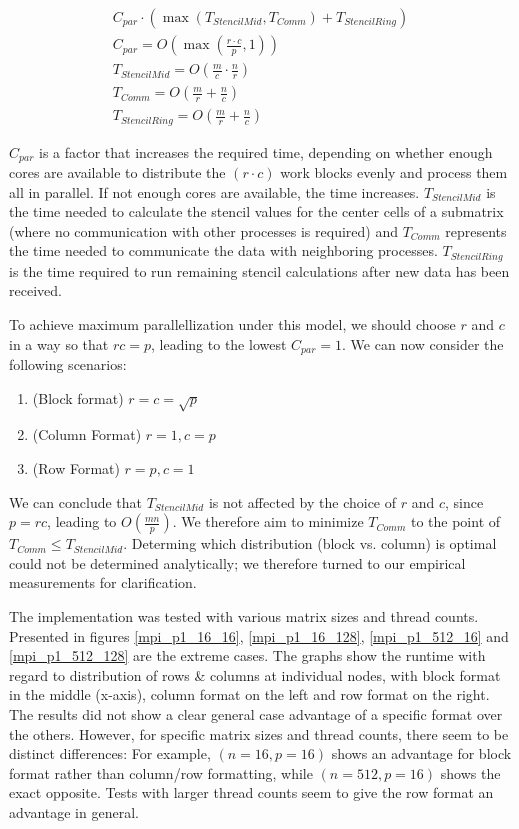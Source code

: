 \documentclass[12pt]{article}
\begin{document}
\begin{eqnarray}
C_{par} \cdot \left( \max(T_{StencilMid}, T_{Comm}) + T_{StencilRing} \right)\\
C_{par} = O\left(\max(\frac{r\cdot c}{p}, 1)\right)\\
T_{StencilMid} = O\left(\frac{m}{c} \cdot \frac{n}{r}\right)\\
T_{Comm} = O\left(\frac{m}{r} + \frac{n}{c}\right)\\
T_{StencilRing} = O\left(\frac{m}{r} + \frac{n}{c}\right)
\end{eqnarray}

$C_{par}$ is a factor that increases the required time, depending on whether enough cores are available to distribute the $(r \cdot c)$ work blocks evenly and process them all in parallel. If not enough cores are available, the time increases. $T_{StencilMid}$ is the time needed to calculate the stencil values for the center cells of a submatrix (where no communication with other processes is required) and $T_{Comm}$ represents the time needed to communicate the data with neighboring processes. $T_{StencilRing}$ is the time required to run remaining stencil calculations after new data has been received.

To achieve maximum parallellization under this model, we should choose $r$ and $c$ in a way so that $rc = p$, leading to the lowest $C_{par} = 1$. We can now consider the following scenarios:

\begin{enumerate}
\item (Block format) $r = c = \sqrt{p}$ 
\item (Column Format) $r = 1, c = p$
\item (Row Format) $r = p, c = 1$
\end{enumerate}

We can conclude that $T_{StencilMid}$ is not affected by the choice of $r$ and $c$, since $p = rc$, leading to $O(\frac{mn}{p})$. We therefore aim to minimize $T_{Comm}$ to the point of $T_{Comm} \leq T_{StencilMid}$. Determing which distribution (block vs. column) is optimal could not be determined analytically; we therefore turned to our empirical measurements for clarification.


The implementation was tested with various matrix sizes and thread counts. Presented in figures \ref{mpi_p1_16_16}, \ref{mpi_p1_16_128}, \ref{mpi_p1_512_16} and \ref{mpi_p1_512_128} are the extreme cases. The graphs show the runtime with regard to distribution of rows \& columns at individual nodes, with block format in the middle (x-axis), column format on the left and row format on the right. The results did not show a clear general case advantage of a specific format over the others. However, for specific matrix sizes and thread counts, there seem to be distinct differences: For example, $(n=16, p=16)$ shows an advantage for block format rather than column/row formatting, while $(n=512, p=16)$ shows the exact opposite. Tests with larger thread counts seem to give the row format an advantage in general.
\end{document}
